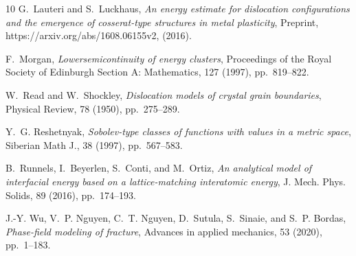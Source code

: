 \documentclass[a4paper,reqno]{amsart}
\theoremstyle{remark}
\numberwithin{equation}{section}
\begin{document}
\begin{thebibliography}{10}
{\sc G.~Lauteri and S.~Luckhaus}, {\em An energy estimate for dislocation
  configurations and the emergence of cosserat-type structures in metal
  plasticity}, Preprint, https://arxiv.org/abs/1608.06155v2,  (2016).

{\sc F.~Morgan}, {\em Lowersemicontinuity of energy clusters}, Proceedings of
  the Royal Society of Edinburgh Section A: Mathematics, 127 (1997),
  pp.~819--822.

{\sc W.~Read and W.~Shockley}, {\em Dislocation models of crystal grain
  boundaries}, Physical Review, 78 (1950), pp.~275--289.

{\sc Y.~G. Reshetnyak}, {\em Sobolev-type classes of functions with values in a
  metric space}, Siberian Math J., 38 (1997), pp.~567--583.

{\sc B.~Runnels, I.~Beyerlen, S.~Conti, and M.~Ortiz}, {\em An analytical model
  of interfacial energy based on a lattice-matching interatomic energy}, J.
  Mech. Phys. Solids, 89 (2016), pp.~174--193.

{\sc J.-Y. Wu, V.~P. Nguyen, C.~T. Nguyen, D.~Sutula, S.~Sinaie, and S.~P.
  Bordas}, {\em Phase-field modeling of fracture}, Advances in applied
  mechanics, 53 (2020), pp.~1--183.

\end{thebibliography}
\end{document}
